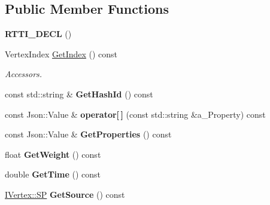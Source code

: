 \subsection*{Public Member Functions}
\begin{DoxyCompactItemize}
\item 
\mbox{\label{class_i_graph_1_1_i_edge_a84847ceffca92e6ca24a4316cd02dc6d}} 
{\bfseries R\+T\+T\+I\+\_\+\+D\+E\+CL} ()
\item 
\mbox{\label{class_i_graph_1_1_i_edge_a72ac71ebf465c2b01fe276c53f242fe5}} 
Vertex\+Index \hyperlink{class_i_graph_1_1_i_edge_a72ac71ebf465c2b01fe276c53f242fe5}{Get\+Index} () const
\begin{DoxyCompactList}\small\item\em Accessors. \end{DoxyCompactList}\item 
\mbox{\label{class_i_graph_1_1_i_edge_af3846ff53ce0843f41e299d7ff9d23dc}} 
const std\+::string \& {\bfseries Get\+Hash\+Id} () const
\item 
\mbox{\label{class_i_graph_1_1_i_edge_a8546ac8596a5f8ef79766364c275c811}} 
const Json\+::\+Value \& {\bfseries operator\mbox{[}$\,$\mbox{]}} (const std\+::string \&a\+\_\+\+Property) const
\item 
\mbox{\label{class_i_graph_1_1_i_edge_a1626fc35aa13ff95f119fd200b2149f3}} 
const Json\+::\+Value \& {\bfseries Get\+Properties} () const
\item 
\mbox{\label{class_i_graph_1_1_i_edge_a7449dba2a9eef3cb728ae95add711bd2}} 
float {\bfseries Get\+Weight} () const
\item 
\mbox{\label{class_i_graph_1_1_i_edge_a7023ed2ea2d343b189546f0f23f9b7db}} 
double {\bfseries Get\+Time} () const
\item 
\mbox{\label{class_i_graph_1_1_i_edge_ac041770706a2331db17a7a7f3af47b90}} 
\hyperlink{class_i_graph_1_1_i_vertex_af72b9df91f110bc7824c608c10cc819c}{I\+Vertex\+::\+SP} {\bfseries Get\+Source} () const
\item 

\end{DoxyCompactItemize}
